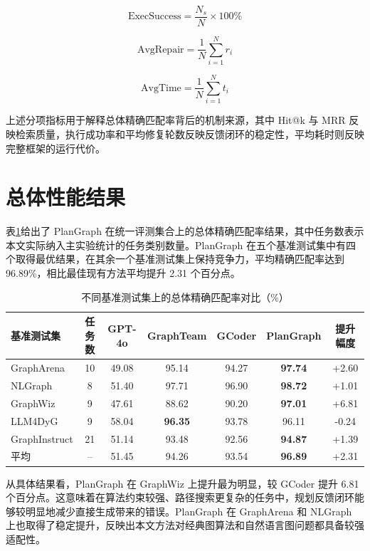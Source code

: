 \begin{equation}
\mathrm{ExecSuccess} = \frac{N_s}{N}\times 100\%
\end{equation}

\begin{equation}
\mathrm{AvgRepair} = \frac{1}{N}\sum_{i=1}^{N} r_i
\end{equation}

\begin{equation}
\mathrm{AvgTime} = \frac{1}{N}\sum_{i=1}^{N} t_i
\end{equation}

上述分项指标用于解释总体精确匹配率背后的机制来源，其中 Hit@k 与 MRR 反映检索质量，执行成功率和平均修复轮数反映反馈闭环的稳定性，平均耗时则反映完整框架的运行代价。

\section{总体性能结果}

表\ref{tab:overall_result}给出了 PlanGraph 在统一评测集合上的总体精确匹配率结果，其中任务数表示本文实际纳入主实验统计的任务类别数量。PlanGraph 在五个基准测试集中有四个取得最优结果，在其余一个基准测试集上保持竞争力，平均精确匹配率达到 96.89\%，相比最佳现有方法平均提升 2.31 个百分点。

\begin{table}[htbp]
\centering
\small
\caption{不同基准测试集上的总体精确匹配率对比（\%）}
\label{tab:overall_result}
\begin{tabular}{lcccccc}
\toprule
基准测试集 & 任务数 & GPT-4o & GraphTeam & GCoder & PlanGraph & 提升幅度 \\
\midrule
GraphArena & 10 & 49.08 & 95.14 & 94.27 & \textbf{97.74} & +2.60 \\
NLGraph & 8 & 51.40 & 97.71 & 96.90 & \textbf{98.72} & +1.01 \\
GraphWiz & 9 & 47.61 & 88.62 & 90.20 & \textbf{97.01} & +6.81 \\
LLM4DyG & 9 & 58.04 & \textbf{96.35} & 93.78 & 96.11 & -0.24 \\
GraphInstruct & 21 & 51.14 & 93.48 & 92.56 & \textbf{94.87} & +1.39 \\
\midrule
平均 & -- & 51.45 & 94.26 & 93.54 & \textbf{96.89} & +2.31 \\
\bottomrule
\end{tabular}
\end{table}

从具体结果看，PlanGraph 在 GraphWiz 上提升最为明显，较 GCoder 提升 6.81 个百分点。这意味着在算法约束较强、路径搜索更复杂的任务中，规划反馈闭环能够较明显地减少直接生成带来的错误。PlanGraph 在 GraphArena 和 NLGraph 上也取得了稳定提升，反映出本文方法对经典图算法和自然语言图问题都具备较强适配性。

